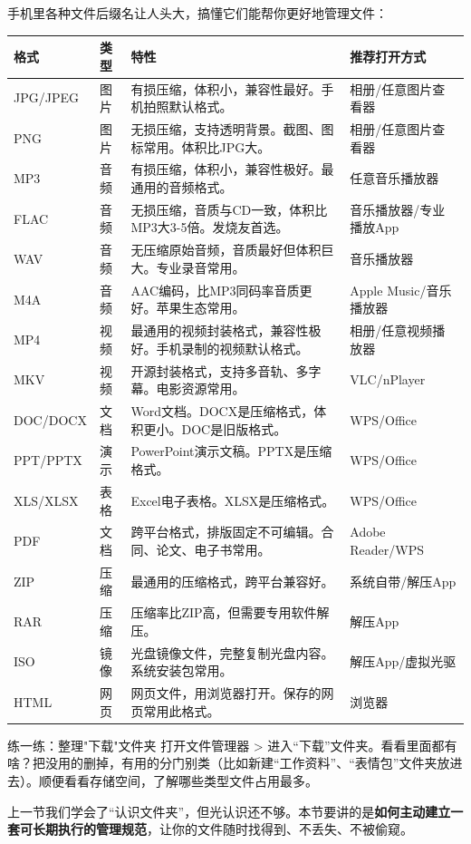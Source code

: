 
手机里各种文件后缀名让人头大，搞懂它们能帮你更好地管理文件：

\begin{center}
\begin{tabularx}{\linewidth}{|X|X|X|X|}
\hline
\textbf{格式} & \textbf{类型} & \textbf{特性} & \textbf{推荐打开方式} \tabularnewline
\hline
JPG/JPEG & 图片 & 有损压缩，体积小，兼容性最好。手机拍照默认格式。 & 相册/任意图片查看器 \tabularnewline
PNG & 图片 & 无损压缩，支持透明背景。截图、图标常用。体积比JPG大。 & 相册/任意图片查看器 \tabularnewline
MP3 & 音频 & 有损压缩，体积小，兼容性极好。最通用的音频格式。 & 任意音乐播放器 \tabularnewline
FLAC & 音频 & 无损压缩，音质与CD一致，体积比MP3大3-5倍。发烧友首选。 & 音乐播放器/专业播放App \tabularnewline
WAV & 音频 & 无压缩原始音频，音质最好但体积巨大。专业录音常用。 & 音乐播放器 \tabularnewline
M4A & 音频 & AAC编码，比MP3同码率音质更好。苹果生态常用。 & Apple Music/音乐播放器 \tabularnewline
MP4 & 视频 & 最通用的视频封装格式，兼容性极好。手机录制的视频默认格式。 & 相册/任意视频播放器 \tabularnewline
MKV & 视频 & 开源封装格式，支持多音轨、多字幕。电影资源常用。 & VLC/nPlayer \tabularnewline
DOC/DOCX & 文档 & Word文档。DOCX是压缩格式，体积更小。DOC是旧版格式。 & WPS/Office \tabularnewline
PPT/PPTX & 演示 & PowerPoint演示文稿。PPTX是压缩格式。 & WPS/Office \tabularnewline
XLS/XLSX & 表格 & Excel电子表格。XLSX是压缩格式。 & WPS/Office \tabularnewline
PDF & 文档 & 跨平台格式，排版固定不可编辑。合同、论文、电子书常用。 & Adobe Reader/WPS \tabularnewline
ZIP & 压缩 & 最通用的压缩格式，跨平台兼容好。 & 系统自带/解压App \tabularnewline
RAR & 压缩 & 压缩率比ZIP高，但需要专用软件解压。 & 解压App \tabularnewline
ISO & 镜像 & 光盘镜像文件，完整复制光盘内容。系统安装包常用。 & 解压App/虚拟光驱 \tabularnewline
HTML & 网页 & 网页文件，用浏览器打开。保存的网页常用此格式。 & 浏览器 \tabularnewline
\hline
\end{tabularx}
\end{center}

\begin{tcbpractice}{练一练：整理"下载"文件夹}
打开文件管理器 > 进入“下载”文件夹。看看里面都有啥？把没用的删掉，有用的分门别类（比如新建“工作资料”、“表情包”文件夹放进去）。顺便看看存储空间，了解哪些类型文件占用最多。

\end{tcbpractice}


上一节我们学会了“认识文件夹”，但光认识还不够。本节要讲的是\textbf{如何主动建立一套可长期执行的管理规范}，让你的文件随时找得到、不丢失、不被偷窥。

